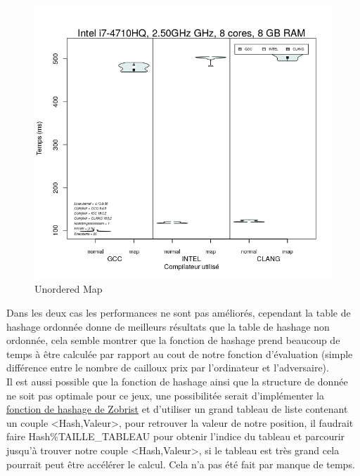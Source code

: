 \documentclass[
 aip,
 jmp,
 amsmath,amssymb,
 reprint
]{revtex4-1}
\begin{document}
\begin{figure}[H]
  \includegraphics[width=\linewidth, keepaspectratio=true]{unsorted_map.png}
  \caption{Unordered Map}
\end{figure}

Dans les deux cas les performances ne sont pas améliorés, cependant la table de hashage ordonnée donne de meilleurs résultats que la table de hashage non ordonnée, cela semble montrer que la fonction de hashage prend beaucoup de temps à être calculée par rapport au cout de notre fonction d'évaluation (simple différence entre le nombre de cailloux prix par l'ordinateur et l'adversaire).\\
Il est aussi possible que la fonction de hashage ainsi que la structure de donnée ne soit pas optimale pour ce jeux, une possibilitée serait d'implémenter la \href{https://chessprogramming.wikispaces.com/Zobrist+Hashing}{fonction de hashage de Zobrist} et d'utiliser un grand tableau de liste contenant un couple <Hash,Valeur>, pour retrouver la valeur de notre position, il faudrait faire Hash\%TAILLE\_TABLEAU pour obtenir l'indice du tableau et parcourir jusqu'à trouver notre couple <Hash,Valeur>, si le tableau est très grand cela pourrait peut être accélérer le calcul. Cela n'a pas été fait par manque de temps.
\end{document}
